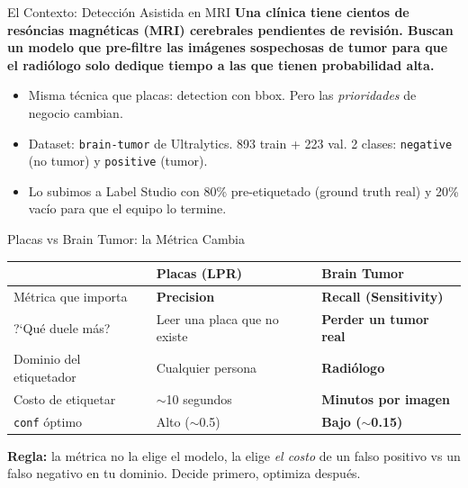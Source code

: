 \begin{frame}[shrink]{El Contexto: Detecci\'on Asistida en MRI}
  \vspace{6pt}
  {\footnotesize\color{arcaDark}\bfseries
    Una cl\'inica tiene cientos de res\'oncias magn\'eticas (MRI) cerebrales
    pendientes de revisi\'on. Buscan un modelo que pre-filtre las
    im\'agenes sospechosas de tumor para que el radi\'ologo solo dedique
    tiempo a las que tienen probabilidad alta.}

  \vspace{12pt}
  {\footnotesize
  \begin{itemize}\setlength{\itemsep}{5pt}
    \item[{\color{arcaRed}\scriptsize\faArrowRight}]
      Misma t\'ecnica que placas: detection con bbox. Pero las
      \emph{prioridades} de negocio cambian.
    \item[{\color{arcaRed}\scriptsize\faArrowRight}]
      Dataset: \texttt{brain-tumor} de Ultralytics. 893 train + 223
      val. 2 clases: \texttt{negative} (no tumor) y \texttt{positive}
      (tumor).
    \item[{\color{codeGreen}\scriptsize\faArrowRight}]
      Lo subimos a Label Studio con 80\% pre-etiquetado (ground truth
      real) y 20\% vac\'io para que el equipo lo termine.
  \end{itemize}
  }
\end{frame}

\begin{frame}[shrink]{Placas vs Brain Tumor: la M\'etrica Cambia}
  \vspace{10pt}
  {\footnotesize
  \begin{tabular}{@{}p{4.0cm} p{4.0cm} p{4.0cm}@{}}
    \toprule
    & \textbf{Placas (LPR)} & \textbf{Brain Tumor} \\
    \midrule
    \rowcolor{arcaGray}
    M\'etrica que importa
    & \textbf{Precision}
    & \textbf{Recall (Sensitivity)} \\
    ?`Qu\'e duele m\'as?
    & Leer una placa que no existe
    & \textbf{Perder un tumor real} \\
    \rowcolor{arcaGray}
    Dominio del etiquetador
    & Cualquier persona
    & \textbf{Radi\'ologo} \\
    Costo de etiquetar
    & $\sim$10 segundos
    & \textbf{Minutos por imagen} \\
    \rowcolor{arcaGray}
    \texttt{conf} \'optimo
    & Alto ($\sim$0.5)
    & \textbf{Bajo ($\sim$0.15)} \\
    \bottomrule
  \end{tabular}
  }

  \vspace{14pt}
  \begin{tcolorbox}[colback=arcaRed!8, colframe=arcaRed, boxrule=0.5pt,
    arc=2pt, left=6pt, right=6pt, top=4pt, bottom=4pt]
    {\scriptsize\color{arcaDark}
    \faKey\hspace{4pt}\textbf{Regla:} la m\'etrica no la elige el modelo,
    la elige \emph{el costo} de un falso positivo vs un falso negativo
    en tu dominio. Decide primero, optimiza despu\'es.}
  \end{tcolorbox}
\end{frame}

